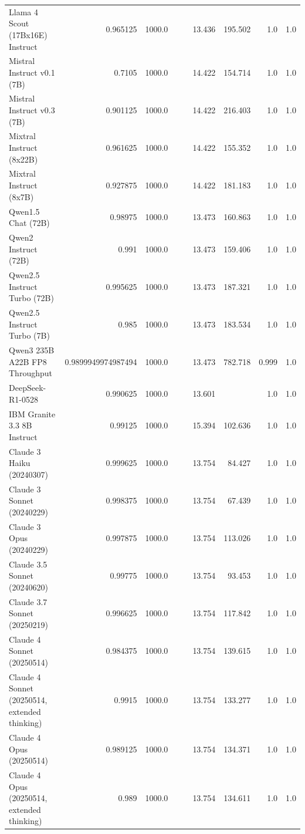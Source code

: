 \begin{table}[htp]
{\begin{tabular}{lrrrrrrrr}
Llama 4 Scout (17Bx16E) Instruct & 0.965125 & 1000.0 &  &  & 13.436 & 195.502 & 1.0 & 1.0 \\
Mistral Instruct v0.1 (7B) & 0.7105 & 1000.0 &  &  & 14.422 & 154.714 & 1.0 & 1.0 \\
Mistral Instruct v0.3 (7B) & 0.901125 & 1000.0 &  &  & 14.422 & 216.403 & 1.0 & 1.0 \\
Mixtral Instruct (8x22B) & 0.961625 & 1000.0 &  &  & 14.422 & 155.352 & 1.0 & 1.0 \\
Mixtral Instruct (8x7B) & 0.927875 & 1000.0 &  &  & 14.422 & 181.183 & 1.0 & 1.0 \\
Qwen1.5 Chat (72B) & 0.98975 & 1000.0 &  &  & 13.473 & 160.863 & 1.0 & 1.0 \\
Qwen2 Instruct (72B) & 0.991 & 1000.0 &  &  & 13.473 & 159.406 & 1.0 & 1.0 \\
Qwen2.5 Instruct Turbo (72B) & 0.995625 & 1000.0 &  &  & 13.473 & 187.321 & 1.0 & 1.0 \\
Qwen2.5 Instruct Turbo (7B) & 0.985 & 1000.0 &  &  & 13.473 & 183.534 & 1.0 & 1.0 \\
Qwen3 235B A22B FP8 Throughput & 0.9899949974987494 & 1000.0 &  &  & 13.473 & 782.718 & 0.999 & 1.0 \\
DeepSeek-R1-0528 & 0.990625 & 1000.0 &  &  & 13.601 &  & 1.0 & 1.0 \\
IBM Granite 3.3 8B Instruct & 0.99125 & 1000.0 &  &  & 15.394 & 102.636 & 1.0 & 1.0 \\
Claude 3 Haiku (20240307) & 0.999625 & 1000.0 &  &  & 13.754 & 84.427 & 1.0 & 1.0 \\
Claude 3 Sonnet (20240229) & 0.998375 & 1000.0 &  &  & 13.754 & 67.439 & 1.0 & 1.0 \\
Claude 3 Opus (20240229) & 0.997875 & 1000.0 &  &  & 13.754 & 113.026 & 1.0 & 1.0 \\
Claude 3.5 Sonnet (20240620) & 0.99775 & 1000.0 &  &  & 13.754 & 93.453 & 1.0 & 1.0 \\
Claude 3.7 Sonnet (20250219) & 0.996625 & 1000.0 &  &  & 13.754 & 117.842 & 1.0 & 1.0 \\
Claude 4 Sonnet (20250514) & 0.984375 & 1000.0 &  &  & 13.754 & 139.615 & 1.0 & 1.0 \\
Claude 4 Sonnet (20250514, extended thinking) & 0.9915 & 1000.0 &  &  & 13.754 & 133.277 & 1.0 & 1.0 \\
Claude 4 Opus (20250514) & 0.989125 & 1000.0 &  &  & 13.754 & 134.371 & 1.0 & 1.0 \\
Claude 4 Opus (20250514, extended thinking) & 0.989 & 1000.0 &  &  & 13.754 & 134.611 & 1.0 & 1.0 \\

\end{tabular}}
\end{table}

